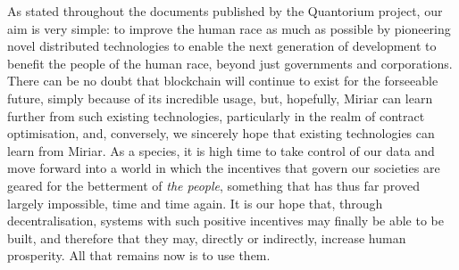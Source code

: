 \documentclass{extreport}
\begin{document}
As stated throughout the documents published by the Quantorium project, our aim is very simple: to improve the human race as much as possible by pioneering novel distributed technologies to enable the next generation of development to benefit the people of the human race, beyond just governments and corporations. There can be no doubt that blockchain will continue to exist for the forseeable future, simply because of its incredible usage, but, hopefully, Miriar can learn further from such existing technologies, particularly in the realm of contract optimisation, and, conversely, we sincerely hope that existing technologies can learn from Miriar. As a species, it is high time to take control of our data and move forward into a world in which the incentives that govern our societies are geared for the betterment of \emph{the people}, something that has thus far proved largely impossible, time and time again. It is our hope that, through decentralisation, systems with such positive incentives may finally be able to be built, and therefore that they may, directly or indirectly, increase human prosperity. All that remains now is to use them.
\end{document}
